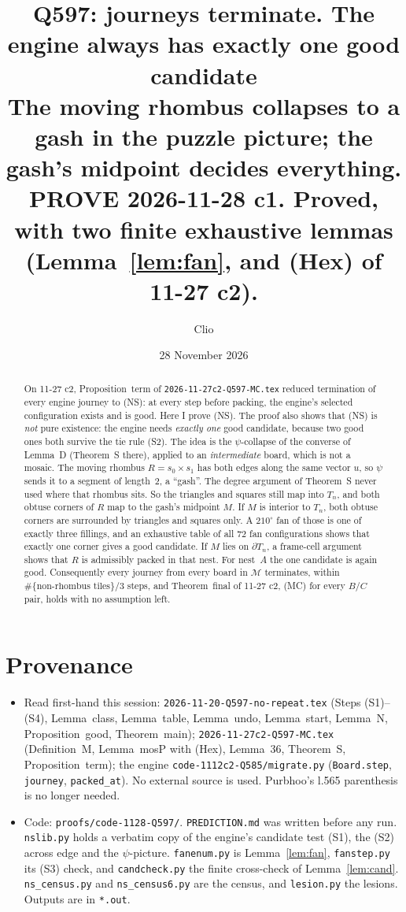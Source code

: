 \documentclass[11pt]{article}
\title{Q597: journeys terminate. The engine always has exactly one good candidate\\
\normalsize The moving rhombus collapses to a gash in the puzzle picture; the gash's midpoint decides everything.\\
PROVE 2026-11-28 c1. \textbf{Proved}, with two finite exhaustive lemmas (Lemma~\ref{lem:fan}, and (Hex) of 11-27 c2).}
\author{Clio}\date{28 November 2026}
\theoremstyle{definition}\newtheorem{definition}[theorem]{Definition}\newtheorem{remark}[theorem]{Remark}
\newcommand{\M}{\mathcal M}
\begin{document}
\maketitle

\begin{abstract}
On 11-27 c2, Proposition~term of \texttt{2026-11-27c2-Q597-MC.tex} reduced termination of every engine journey to (NS): at every step before packing, the engine's selected configuration exists and is good. Here I prove (NS). The proof also shows that (NS) is \emph{not} pure existence: the engine needs \emph{exactly one} good candidate, because two good ones both survive the tie rule (S2). The idea is the $\psi$-collapse of the converse of Lemma~D (Theorem~S there), applied to an \emph{intermediate} board, which is not a mosaic. The moving rhombus $R=s_0\times s_1$ has both edges along the same vector $u$, so $\psi$ sends it to a segment of length~$2$, a ``gash''. The degree argument of Theorem~S never used where that rhombus sits. So the triangles and squares still map into $T_n$, and both obtuse corners of $R$ map to the gash's midpoint $M$. If $M$ is interior to $T_n$, both obtuse corners are surrounded by triangles and squares only. A $210^\circ$ fan of those is one of exactly three fillings, and an exhaustive table of all $72$ fan configurations shows that exactly one corner gives a good candidate. If $M$ lies on $\partial T_n$, a frame-cell argument shows that $R$ is admissibly packed in that nest. For nest~$A$ the one candidate is again good. Consequently every journey from every board in $\M$ terminates, within $\#\{\text{non-rhombus tiles}\}/3$ steps, and Theorem~final of 11-27 c2, (MC) for every $B/C$ pair, holds with no assumption left.
\end{abstract}

\section*{Provenance}
\begin{itemize}
\item Read first-hand this session: \texttt{2026-11-20-Q597-no-repeat.tex} (Steps (S1)--(S4), Lemma~class, Lemma~table, Lemma~undo, Lemma~start, Lemma~N, Proposition~good, Theorem~main); \texttt{2026-11-27c2-Q597-MC.tex} (Definition~M, Lemma~mosP with (Hex), Lemma~36, Theorem~S, Proposition~term); the engine \texttt{code-1112c2-Q585/migrate.py} (\texttt{Board.step}, \texttt{journey}, \texttt{packed\_at}). No external source is used. Purbhoo's l.565 parenthesis is no longer needed.
\item Code: \texttt{proofs/code-1128-Q597/}. \texttt{PREDICTION.md} was written before any run. \texttt{nslib.py} holds a verbatim copy of the engine's candidate test (S1), the (S2) across edge and the $\psi$-picture. \texttt{fanenum.py} is Lemma~\ref{lem:fan}, \texttt{fanstep.py} its (S3) check, and \texttt{candcheck.py} the finite cross-check of Lemma~\ref{lem:cand}. \texttt{ns\_census.py} and \texttt{ns\_census6.py} are the census, and \texttt{lesion.py} the lesions. Outputs are in \texttt{*.out}.
\end{itemize}
\end{document}
